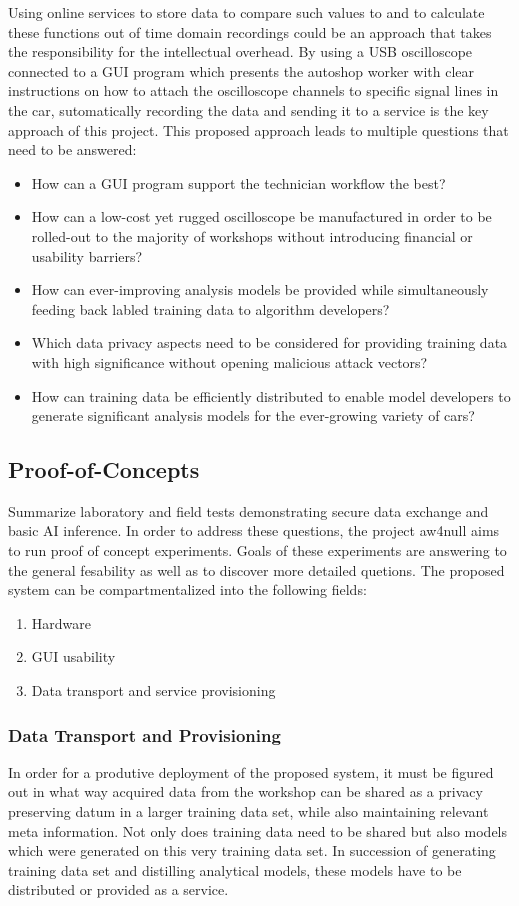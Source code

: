 Using online services to store data to compare such values to and to calculate these functions out of time domain recordings could be an approach that takes the responsibility for the intellectual overhead.
By using a USB oscilloscope connected to a GUI program which presents the autoshop worker with clear instructions on how to attach the oscilloscope channels to specific signal lines in the car, sutomatically recording the data and sending it to a service is the key approach of this project. 
This proposed approach leads to multiple questions that need to be answered:
\begin{itemize}
  \item How can a GUI program support the technician workflow the best?
  \item How can a low-cost yet rugged oscilloscope be manufactured in order to be rolled-out to the majority of workshops without introducing financial or usability barriers?
  \item How can ever-improving analysis models be provided while simultaneously feeding back labled training data to algorithm developers?
  \item Which data privacy aspects need to be considered for providing training data with high significance without opening malicious attack vectors?
  \item How can training data be efficiently distributed to enable model developers to generate significant analysis models for the ever-growing variety of cars?
\end{itemize}

\subsection{Proof-of-Concepts}
Summarize laboratory and field tests demonstrating secure data exchange and basic AI inference.
In order to address these questions, the project aw4null aims to run proof of concept experiments.
Goals of these experiments are answering to the general fesability as well as to discover more detailed quetions.
The proposed system can be compartmentalized into the following fields:
\begin{enumerate}
  \item Hardware
  \item GUI usability
  \item Data transport and service provisioning 
\end{enumerate}

\subsubsection{Data Transport and Provisioning}
In order for a produtive deployment of the proposed system, it must be figured out in what way acquired data from the workshop can be shared as a privacy preserving datum in a larger training data set, while also maintaining relevant meta information.
Not only does training data need to be shared but also models which were generated on this very training data set.
In succession of generating training data set and distilling analytical models, these models have to be distributed or provided as a service.

